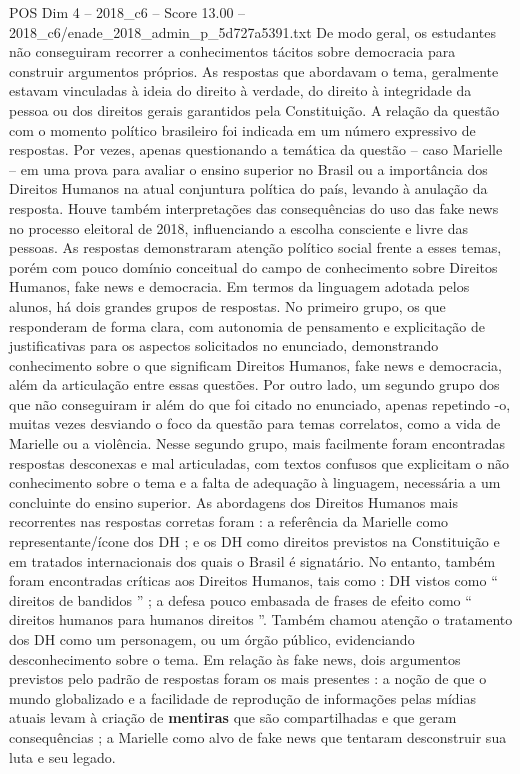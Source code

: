 \begin{textsample}{POS Dim 4 – 2018\_c6 – Score 13.00 – 2018\_c6/enade\_2018\_admin\_p\_5d727a5391.txt}
De modo geral, os estudantes não conseguiram recorrer a conhecimentos tácitos sobre democracia para construir argumentos próprios.
As respostas que abordavam o tema, geralmente estavam vinculadas à ideia do direito à verdade, do direito à integridade da pessoa ou dos direitos gerais garantidos pela Constituição.
A relação da questão com o momento político brasileiro foi indicada em um número expressivo de respostas.
Por vezes, apenas questionando a temática da questão – caso Marielle – em uma prova para avaliar o ensino superior no Brasil ou a importância dos Direitos Humanos na atual conjuntura política do país, levando à anulação da resposta.
Houve também interpretações das consequências do uso das fake news no processo eleitoral de 2018, influenciando a escolha consciente e livre das pessoas.
As respostas demonstraram atenção político social frente a esses temas, porém com pouco domínio conceitual do campo de conhecimento sobre Direitos Humanos, fake news e democracia.
Em termos da linguagem adotada pelos alunos, há dois grandes grupos de respostas.
No primeiro grupo, os que responderam de forma clara, com autonomia de pensamento e explicitação de justificativas para os aspectos solicitados no enunciado, demonstrando conhecimento sobre o que significam Direitos Humanos, fake news e democracia, além da articulação entre essas questões.
Por outro lado, um segundo grupo dos que não conseguiram ir além do que foi citado no enunciado, apenas repetindo -o, muitas vezes desviando o foco da questão para temas correlatos, como a vida de Marielle ou a violência.
Nesse segundo grupo, mais facilmente foram encontradas respostas desconexas e mal articuladas, com textos confusos que explicitam o não conhecimento sobre o tema e a falta de adequação à linguagem, necessária a um concluinte do ensino superior.
As abordagens dos Direitos Humanos mais recorrentes nas respostas corretas foram : a referência da Marielle como representante/ícone dos DH ; e os DH como direitos previstos na Constituição e em tratados internacionais dos quais o Brasil é signatário.
No entanto, também foram encontradas críticas aos Direitos Humanos, tais como : DH vistos como “ direitos de bandidos ” ; a defesa pouco embasada de frases de efeito como “ direitos humanos para humanos direitos ”.
Também chamou atenção o tratamento dos DH como um personagem, ou um órgão público, evidenciando desconhecimento sobre o tema.
Em relação às fake news, dois argumentos previstos pelo padrão de respostas foram os mais presentes : a noção de que o mundo globalizado e a facilidade de reprodução de informações pelas mídias atuais levam à criação de \textbf{mentiras} que são compartilhadas e que geram consequências ; a Marielle como alvo de fake news que tentaram desconstruir sua luta e seu legado.

\end{textsample}
